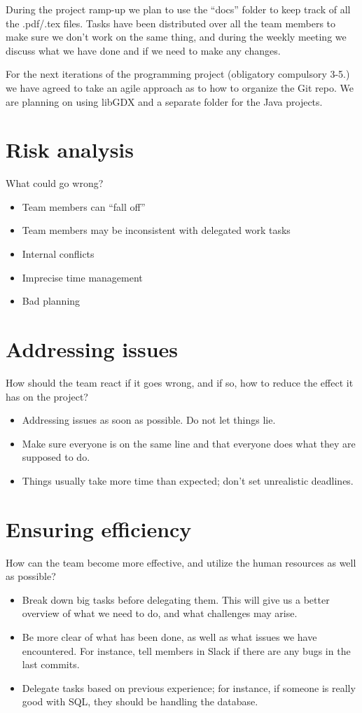 \documentclass{article}
\begin{document}
During the project ramp-up we plan to use the “docs” folder to keep track of all the .pdf/.tex files. Tasks have been distributed over all the team members to make sure we don’t work on the same thing, and during the weekly meeting we discuss what we have done and if we need to make any changes.

For the next iterations of the programming project (obligatory compulsory 3-5.) we have agreed to take an agile approach as to how to organize the Git repo. We are planning on using libGDX and a separate folder for the Java projects.

\section*{Risk analysis}
What could go wrong?
\begin{itemize}
    \item Team members can “fall off”
    \item Team members may be inconsistent with delegated work tasks
    \item Internal conflicts
    \item Imprecise time management
    \item Bad planning
\end{itemize}

\section*{Addressing issues}
How should the team react if it goes wrong, and if so, how to reduce the effect it has on the project?
\begin{itemize}
    \item Addressing issues as soon as possible. Do not let things lie.
    \item Make sure everyone is on the same line and that everyone does what they are supposed to do.
    \item Things usually take more time than expected; don’t set unrealistic deadlines.
\end{itemize}

\section*{Ensuring efficiency}
How can the team become more effective, and utilize the human resources as well as possible?
\begin{itemize}
	\item Break down big tasks before delegating them. This will give us a better overview of what we need to do, and what challenges may arise.
	\item Be more clear of what has been done, as well as what issues we have encountered. For instance, tell members in Slack if there are any bugs in the last commits.
	\item Delegate tasks based on previous experience; for instance, if someone is really good with SQL, they should be handling the database.
\end{itemize}
\end{document}
